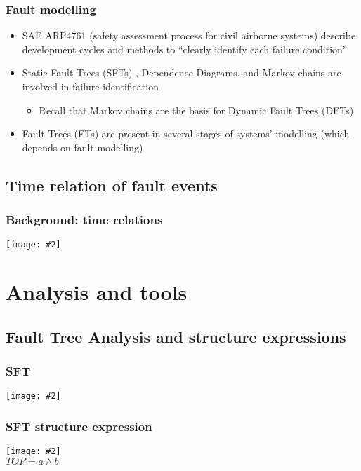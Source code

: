 \documentclass{beamer}
\def\FT{%
	Fault Tree (FT)%
	\gdef\FT{FT\xspace}%
	\gdef\FTs{FTs\xspace}%
	\xspace%
}
\def\FTs{%
	Fault Trees (FTs)%
	\gdef\FT{FT\xspace}%
	\gdef\FTs{FTs\xspace}%
	\xspace%
}
\def\SFT{%
	Static Fault Tree (SFT)%
	\gdef\SFT{SFT\xspace}%
	\gdef\SFTs{SFTs\xspace}%
	\xspace%
}
\def\SFTs{%
	Static Fault Trees (SFTs)%
	\gdef\SFT{SFT\xspace}%
	\gdef\SFTs{SFTs\xspace}%
	\xspace%
}
\def\DFT{%
	Dynamic Fault Tree (DFT)%
	\gdef\DFT{DFT\xspace}%
	\gdef\DFTs{DFTs\xspace}%
	\xspace%
}
\def\DFTs{%
	Dynamic Fault Trees (DFTs)%
	\gdef\DFT{DFT\xspace}%
	\gdef\DFTs{DFTs\xspace}%
	\xspace%
}
\newcommand{\includegraphicsaspectratio}[2][1]{%
  \texttt{[image: \#2]}%
}
\begin{document}
\begin{frame}
	\frametitle{Fault modelling}
	\begin{itemize}
		\item SAE ARP4761 (safety assessment process for civil airborne systems) describe development cycles and methods to ``clearly identify each failure condition''
		\item \SFTs, Dependence Diagrams, and Markov chains are involved in failure identification
		\begin{itemize}
			\item Recall that Markov chains are the basis for \DFTs
		\end{itemize}
		\item \FTs are present in several stages of systems' modelling (which depends on fault modelling)
	\end{itemize}
\end{frame}

\subsection{Time relation of fault events}

\begin{frame}
	\frametitle{Background: time relations}
	\begin{center}
		\includegraphicsaspectratio[0.5]{time-relations}
	\end{center}
\end{frame}

\section{Analysis and tools}
\subsection{Fault Tree Analysis and structure expressions}
\begin{frame}
	\frametitle{\SFT}
	\begin{center}
		\includegraphicsaspectratio[0.9]{sft-example-ald-software}
	\end{center}
\end{frame}

\begin{frame}
	\frametitle{\SFT structure expression}
	\begin{center}
		\includegraphicsaspectratio[0.45]{ex-fault-tree1}\\
		$TOP = a \land b$
	\end{center}
\end{frame}
\end{document}
